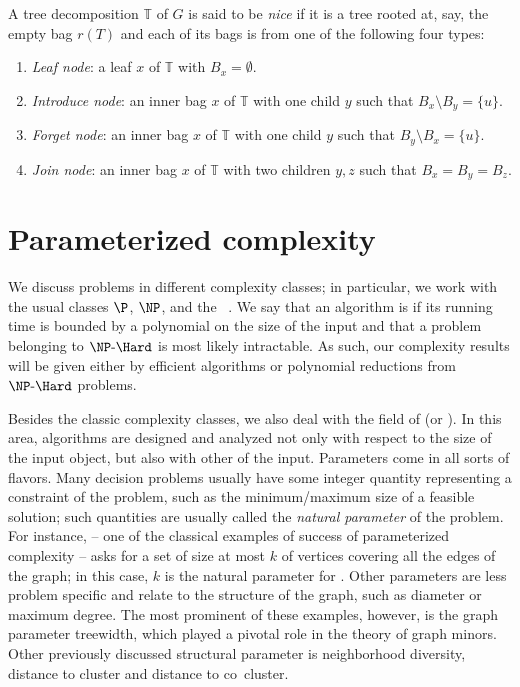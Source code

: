 \begin{class_definition*}
    A tree decomposition $\mathbb{T}$ of $G$ is said to be \emph{nice} if it is a tree rooted at, say, the empty bag $r(T)$ and each of its bags is from one of the following four types:
    \begin{enumerate}
        \item \emph{Leaf node}: a leaf $x$ of $\mathbb{T}$ with $B_x = \emptyset$.
        \item \emph{Introduce node}: an inner bag $x$ of $\mathbb{T}$ with one child $y$ such that $B_x \setminus B_y = \{u\}$.
        \item \emph{Forget node}: an inner bag $x$ of $\mathbb{T}$ with one child $y$ such that $B_y \setminus B_x = \{u\}$.
        \item \emph{Join node}: an inner bag $x$ of $\mathbb{T}$ with two children $y,z$ such that $B_x = B_y = B_z$.
    \end{enumerate}
\end{class_definition*}

\section{Parameterized complexity}

We discuss problems in different complexity classes; in particular, we work with the usual classes $\P$, $\NP$, and the ~\citep{polynomial_hierarchy}.
We say that an algorithm is  if its running time is bounded by a polynomial on the size of the input and that a problem belonging to $\NPH$ is most likely intractable.
As such, our complexity results will be given either by efficient algorithms or polynomial reductions from $\NPH$ problems.

Besides the classic complexity classes, we also deal with the field of  (or ).
In this area, algorithms are designed and analyzed not only with respect to the size of the input object, but also with other  of the input.
Parameters come in all sorts of flavors.
Many decision problems usually have some integer quantity representing a constraint of the problem, such as the minimum/maximum size of a feasible solution; such quantities are usually called the \textit{natural parameter} of the problem.
For instance,  -- one of the classical examples of success of parameterized complexity -- asks for a set of size at most $k$ of vertices covering all the edges of the graph; in this case, $k$ is the natural parameter for .
Other parameters are less problem specific and relate to the structure of the graph, such as diameter or maximum degree.
The most prominent of these examples, however, is the graph parameter treewidth, which played a pivotal role in the theory of graph minors.
Other previously discussed structural parameter is neighborhood diversity, distance to cluster and distance to co~cluster.


